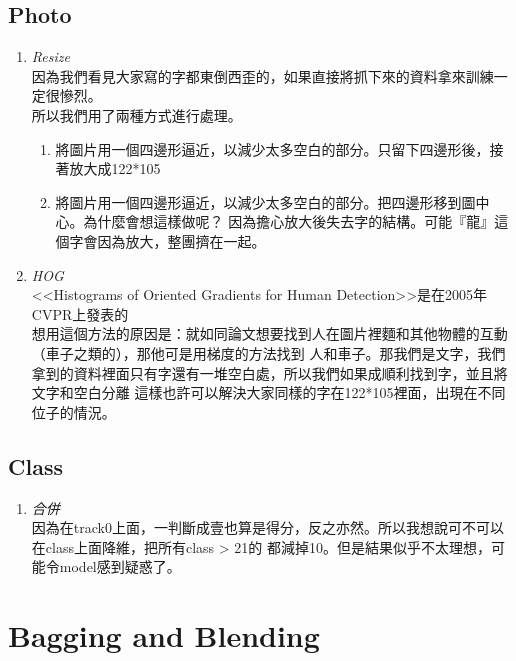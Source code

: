 \documentclass[12pt]{article}
\theoremstyle{definition}
\theoremstyle{remark}
\begin{document}
\subsection{Photo}
\begin{enumerate}
  \item \large{\em \color{red}Resize\/}\\
    因為我們看見大家寫的字都東倒西歪的，如果直接將抓下來的資料拿來訓練一定很慘烈。\\
    所以我們用了兩種方式進行處理。
    \begin{enumerate}
      \item 將圖片用一個四邊形逼近，以減少太多空白的部分。只留下四邊形後，接著放大成122*105
      \item 將圖片用一個四邊形逼近，以減少太多空白的部分。把四邊形移到圖中心。為什麼會想這樣做呢？
        因為擔心放大後失去字的結構。可能『龍』這個字會因為放大，整團擠在一起。
    \end{enumerate}
  \item \large{\em \color{red}HOG\/}\\
    <<Histograms of Oriented Gradients for Human Detection>>是在2005年CVPR上發表的\\
    想用這個方法的原因是：就如同論文想要找到人在圖片裡麵和其他物體的互動（車子之類的），那他可是用梯度的方法找到
    人和車子。那我們是文字，我們拿到的資料裡面只有字還有一堆空白處，所以我們如果成順利找到字，並且將文字和空白分離
    這樣也許可以解決大家同樣的字在122*105裡面，出現在不同位子的情況。
\end{enumerate}
\subsection{Class}
\begin{enumerate}
  \item \large{\em \color{red}合併\/}\\
    因為在track0上面，一判斷成壹也算是得分，反之亦然。所以我想說可不可以在class上面降維，把所有class > 21的
    都減掉10。但是結果似乎不太理想，可能令model感到疑惑了。
\end{enumerate}
\section{Bagging and Blending}
\end{document}
